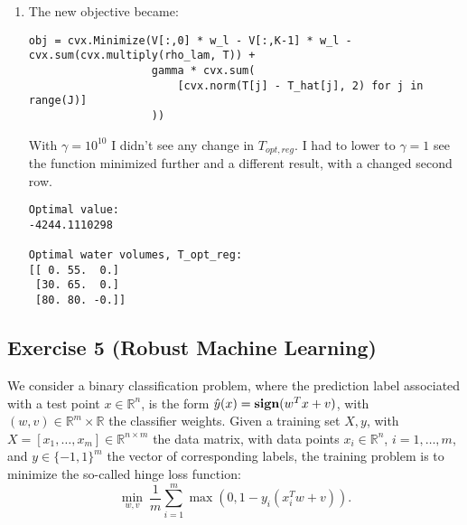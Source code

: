 \documentclass[11pt]{article}
\begin{document}
\begin{solution}
\begin{enumerate}
\item The new objective became:
    \begin{verbatim}
obj = cvx.Minimize(V[:,0] * w_l - V[:,K-1] * w_l - cvx.sum(cvx.multiply(rho_lam, T)) +
                   gamma * cvx.sum(
                       [cvx.norm(T[j] - T_hat[j], 2) for j in range(J)]
                   ))
    \end{verbatim}

    With $\gamma = 10^{10}$ I didn't see any change in $T_{opt,reg}$. I had to lower to $\gamma = 1$ see the function minimized further and a different result, with a changed second row.

    \begin{verbatim}
Optimal value:
-4244.1110298

Optimal water volumes, T_opt_reg:
[[ 0. 55.  0.]
 [30. 65.  0.]
 [80. 80. -0.]]
    \end{verbatim}
\end{enumerate}
\end{solution}

\newpage
\subsection*{Exercise 5 (Robust Machine Learning)}

We consider a binary classification problem, where the prediction label associated with a test point $x \in \mathbb{R}^{n}$, is the form $\hat{y}(x) = \mbox{\bf sign}(w^Tx+v)$, with $(w,v) \in \mathbb{R}^{m} \times \mathbb{R}$ the classifier weights. Given a training set $X,y$, with $X = [x_1,\ldots,x_m]\in \mathbb{R}^{n \times m}$ the data matrix, with data points $x_i \in \mathbb{R}^{n}$, $i=1,\ldots,m$, and $y \in \{-1,1\}^m$ the vector of corresponding labels, the training problem is to minimize the so-called hinge loss function:
\begin{equation}\label{eq:hinge}
    \min_{w,v} \: \frac{1}{m}\sum_{i=1}^m \max(0,1-y_i(x_i^Tw + v)).
\end{equation}
\end{document}
